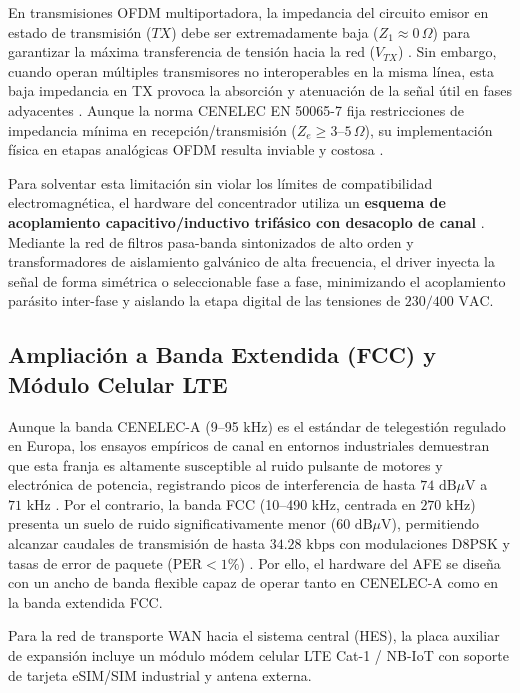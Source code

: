 En transmisiones OFDM multiportadora, la impedancia del circuito emisor en estado de transmisión ($TX$) debe ser extremadamente baja ($Z_1 \approx 0\,\Omega$) para garantizar la máxima transferencia de tensión hacia la red ($V_{TX}$) \cite{6525864}. Sin embargo, cuando operan múltiples transmisores no interoperables en la misma línea, esta baja impedancia en TX provoca la absorción y atenuación de la señal útil en fases adyacentes \cite{6525864}. Aunque la norma CENELEC EN 50065-7 fija restricciones de impedancia mínima en recepción/transmisión ($Z_e \ge 3\text{--}5\,\Omega$), su implementación física en etapas analógicas OFDM resulta inviable y costosa \cite{6525864}.

Para solventar esta limitación sin violar los límites de compatibilidad electromagnética, el hardware del concentrador utiliza un \textbf{esquema de acoplamiento capacitivo/inductivo trifásico con desacoplo de canal} \cite{6525864, 5764420}. Mediante la red de filtros pasa-banda sintonizados de alto orden y transformadores de aislamiento galvánico de alta frecuencia, el driver inyecta la señal de forma simétrica o seleccionable fase a fase, minimizando el acoplamiento parásito inter-fase y aislando la etapa digital de las tensiones de $230/400\text{ VAC}$.

\subsection{Ampliación a Banda Extendida (FCC) y Módulo Celular LTE}
\label{subsec:banda_fcc_lte}

Aunque la banda CENELEC-A (9--95 kHz) es el estándar de telegestión regulado en Europa, los ensayos empíricos de canal en entornos industriales demuestran que esta franja es altamente susceptible al ruido pulsante de motores y electrónica de potencia, registrando picos de interferencia de hasta $74\text{ dB}\mu\text{V}$ a $71\text{ kHz}$ \cite{7390450}. Por el contrario, la banda FCC (10--490 kHz, centrada en $270\text{ kHz}$) presenta un suelo de ruido significativamente menor ($60\text{ dB}\mu\text{V}$), permitiendo alcanzar caudales de transmisión de hasta $34.28\text{ kbps}$ con modulaciones D8PSK y tasas de error de paquete ($\text{PER} < 1\%$) \cite{7390450}. Por ello, el hardware del AFE se diseña con un ancho de banda flexible capaz de operar tanto en CENELEC-A como en la banda extendida FCC.

Para la red de transporte WAN hacia el sistema central (HES), la placa auxiliar de expansión incluye un módulo módem celular LTE Cat-1 / NB-IoT con soporte de tarjeta eSIM/SIM industrial y antena externa.

